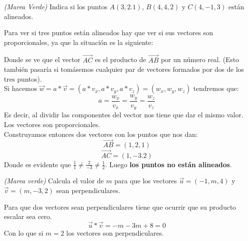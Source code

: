 \documentclass[a4paper,11pt,answers]{exam}
\begin{document}
\begin{questions}
\question \textit{(Marea Verde)} Indica si los puntos $A(3,2.1)$, $B(4,4,2)$ y $C(4,-1,3)$ están alineados.
\begin{solution}
Para ver si tres puntos están alineados hay que ver si sus vectores son proporcionales, ya que la situación es la siguiente:

\begin{center}
\end{center}
Donde se ve que el vector $\overrightarrow{AC}$ es el producto de $\overrightarrow{AB}$ por un número real. (Esto también pasaría si tomásemos cualquier par de vectores formados por dos de los tres puntos).\\

Si hacemos $\vec{w} = a*\vec{v} = (a*v_x, a*v_y, a*v_z) = (w_x, w_y, w_z)$ tendremos que:
\[a = \frac{w_x}{v_x} = \frac{w_y}{v_y} = \frac{w_z}{v_z}\]
Es decir, al dividir las componentes del vector nos tiene que dar el mismo valor. Los vectores son proporcionales.\\
Construyamos entonces dos vectores con los puntos que nos dan:
\[\overrightarrow{AB} = (1, 2, 1)\]
\[\overrightarrow{AC} = (1, -3. 2)\]
Donde es evidente que $\frac{1}{1} \neq \frac{2}{-3} \neq \frac{1}{2}$. Luego \textbf{los puntos no están alineados}.
\end{solution}

\question \textit{(Marea verde)} Calcula el valor de $m$ para que los vectores $\vec{u} = (-1, m, 4)$ y $\vec{v} = (m, -3, 2)$ sean perpendiculares.
\begin{solution}
Para que dos vectores sean perpendiculares tiene que ocurrir que su producto escalar sea cero.
\[\vec{u}*\vec{v} = -m -3m + 8 = 0\]
Con lo que si $m=2$ los vectores son perpendiculares.
\end{solution}


\end{questions}
\end{document}
